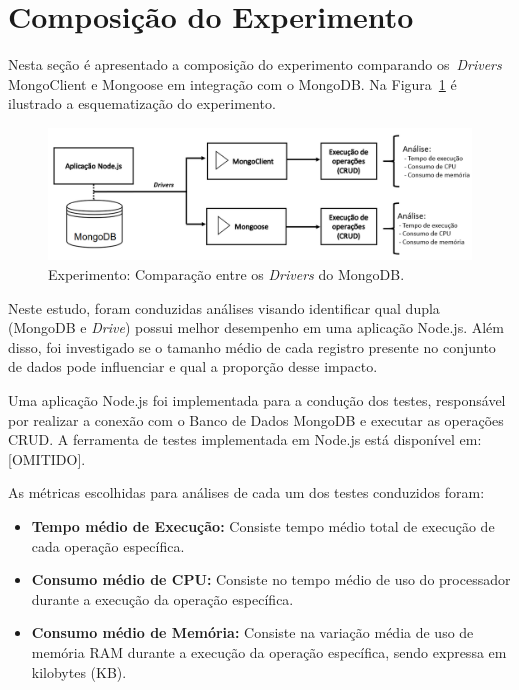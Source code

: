 \documentclass[12pt]{article}
\begin{document}
\section{Composição do Experimento}
\label{section:experimento}

Nesta seção é apresentado a composição do experimento comparando os~\emph{Drivers} MongoClient e Mongoose em integração com o MongoDB. 
Na Figura~\ref{figure:diagrama-banco} é ilustrado a esquematização do experimento. 

\begin{figure}[!ht]
    \centering
    \includegraphics[width=\textwidth]{images/esquema-experimento.png}
    \caption{Experimento: Comparação entre os \emph{Drivers} do MongoDB.}
    \label{figure:diagrama-banco}
\end{figure}
 
Neste estudo, foram conduzidas análises visando identificar qual dupla (MongoDB e \emph{Drive}) possui melhor desempenho em uma aplicação Node.js. 
Além disso, foi investigado se o tamanho médio de cada registro presente no conjunto de dados pode influenciar e qual a proporção desse impacto.

Uma aplicação Node.js foi implementada para a condução dos testes, responsável por realizar a conexão com o Banco de Dados MongoDB e executar as operações CRUD. A ferramenta de testes implementada em Node.js está disponível em: [OMITIDO].%

As métricas escolhidas para análises de cada um dos testes conduzidos foram:

\begin{itemize}
\item \textbf{Tempo médio de Execução:} Consiste tempo médio total de execução de cada operação específica.
\item \textbf{Consumo médio de CPU:} Consiste no tempo médio de uso do processador durante a execução da operação específica.
\item \textbf{Consumo médio de Memória:} Consiste na variação média de uso de memória RAM durante a execução da operação específica, sendo expressa em kilobytes (KB).
\end{itemize}
\end{document}

